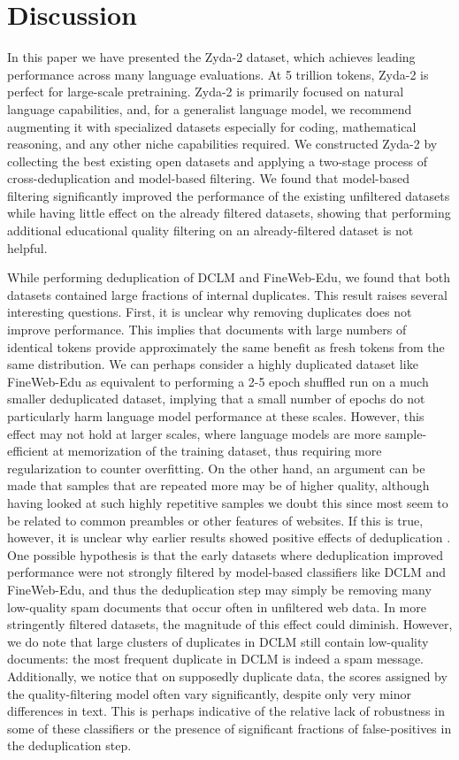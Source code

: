 \documentclass[conference]{IEEEtran}
\begin{document}
\section{Discussion}

In this paper we have presented the Zyda-2 dataset, which achieves leading performance across many language evaluations. At 5 trillion tokens, Zyda-2 is perfect for large-scale pretraining. Zyda-2 is primarily focused on natural language capabilities, and, for a generalist language model, we recommend augmenting it with specialized datasets especially for coding, mathematical reasoning, and any other niche capabilities required. We constructed Zyda-2 by collecting the best existing open datasets and applying a two-stage process of cross-deduplication and model-based filtering. We found that model-based filtering significantly improved the performance of the existing unfiltered datasets while having little effect on the already filtered datasets, showing that performing additional educational quality filtering on an already-filtered dataset is not helpful. 

While performing deduplication of DCLM and FineWeb-Edu, we found that both datasets contained large fractions of internal duplicates. This result raises several interesting questions. First, it is unclear why removing duplicates does not improve performance. This implies that documents with large numbers of identical tokens provide approximately the same benefit as fresh tokens from the same distribution. We can perhaps consider a highly duplicated dataset like FineWeb-Edu as equivalent to performing a 2-5 epoch shuffled run on a much smaller deduplicated dataset, implying that a small number of epochs do not particularly harm language model performance at these scales. However, this effect may not hold at larger scales, where language models are more sample-efficient at memorization of the training dataset, thus requiring more regularization to counter overfitting. On the other hand, an argument can be made that samples that are repeated more may be of higher quality, although having looked at such highly repetitive samples we doubt this since most seem to be related to common preambles or other features of websites. If this is true, however, it is unclear why earlier results showed positive effects of deduplication \citep{lee2021deduplicating}. One possible hypothesis is that the early datasets where deduplication improved performance were not strongly filtered by model-based classifiers like DCLM and FineWeb-Edu, and thus the deduplication step may simply be removing many low-quality spam documents that occur often in unfiltered web data. In more stringently filtered datasets, the magnitude of this effect could diminish. However, we do note that large clusters of duplicates in DCLM still contain low-quality documents: the most frequent duplicate in DCLM is indeed a spam message. Additionally, we notice that on supposedly duplicate data, the scores assigned by the quality-filtering model often vary significantly, despite only very minor differences in text. This is perhaps indicative of the relative lack of robustness in some of these classifiers or the presence of significant fractions of false-positives in the deduplication step.
\end{document}
